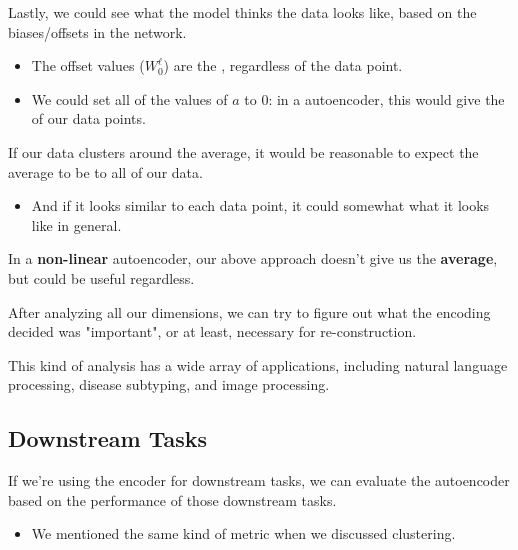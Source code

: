         \begin{concept}
            Lastly, we could see what the model thinks the data  looks like, based on the biases/offsets in the network.
                \begin{itemize}
                    \item The offset values ($W_0^\ell$) are the , regardless of the data point.
                    
                    \item We could set all of the values of $a$ to 0: in a  autoencoder, this would give the  of our data points. 
                \end{itemize}

                \subsecdiv

            If our data clusters around the average, it would be reasonable to expect the average to be  to all of our data.

            \begin{itemize}
                \item And if it looks similar to each data point, it could somewhat  what it looks like in general.
            \end{itemize}

            In a \textbf{non-linear} autoencoder, our above approach doesn't give us the \textbf{average}, but could be useful regardless.
        \end{concept}


        After analyzing all our dimensions, we can try to figure out what  the encoding decided was "important", or at least, necessary for re-construction.

        This kind of analysis has a wide array of applications, including natural language processing, disease subtyping, and image processing.

    \subsection{Downstream Tasks}

        If we're using the encoder for downstream tasks, we can evaluate the autoencoder based on the performance of those downstream tasks.

        \begin{itemize}
            \item We mentioned the same kind of metric when we discussed clustering.\\
        \end{itemize}

